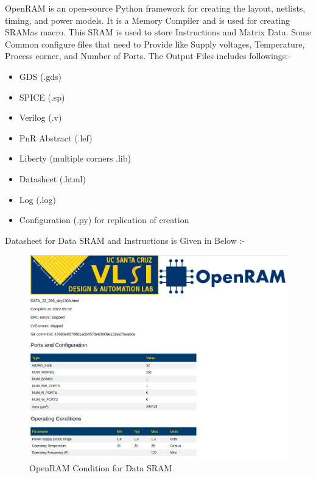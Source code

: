 OpenRAM\cite{OpenRAM} is an open-source Python framework for creating the layout, netlists, timing, and power models. It is a Memory Compiler and is used for creating SRAMas macro. This SRAM is used to store Instructions and Matrix Data. Some Common configure files that need to Provide like Supply voltages, Temperature, Process corner, and Number of Ports.
The Output Files includes followings:-
\begin{itemize}
  \itemsep0em 
\item GDS (.gds)
\item SPICE (.sp)
\item Verilog (.v)
\item PnR Abstract (.lef)
\item Liberty (multiple corners .lib)
\item Datasheet (.html)
\item Log (.log)
\item Configuration (.py) for replication of creation
\end{itemize}
Datasheet for Data SRAM and Instructions is Given in Below :-
  \begin{figure}
  \centering
  \includegraphics[width=0.8\linewidth]{./ASIC/OpenRAM_Condition.png}
  \caption{OpenRAM Condition for Data SRAM}
  \end{figure}

